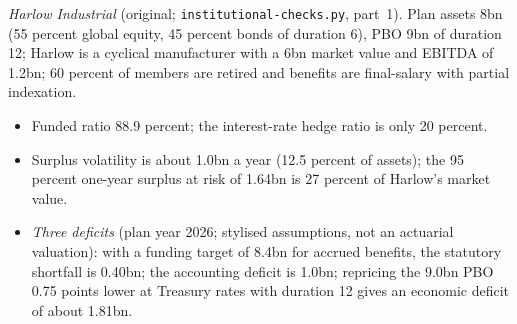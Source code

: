 \begin{qfmethod}
 \emph{Harlow Industrial} (original; \texttt{institutional-checks.py}, part~1). Plan assets 8bn (55 percent global equity, 45 percent bonds of duration 6), PBO 9bn of duration 12; Harlow is a cyclical manufacturer with a 6bn market value and EBITDA of 1.2bn; 60 percent of members are retired and benefits are final-salary with partial indexation.
\begin{itemize}
\item Funded ratio 88.9 percent; the interest-rate hedge ratio is only 20 percent.
\item Surplus volatility is about 1.0bn a year (12.5 percent of assets); the 95 percent one-year surplus at risk of 1.64bn is 27 percent of Harlow's market value.
\item \emph{Three deficits} (plan year 2026; stylised assumptions, not an actuarial valuation): with a funding target of 8.4bn for accrued benefits, the statutory shortfall is 0.40bn; the accounting deficit is 1.0bn; repricing the 9.0bn PBO 0.75 points lower at Treasury rates with duration 12 gives an economic deficit of about 1.81bn.

\end{itemize}
\end{qfmethod}
